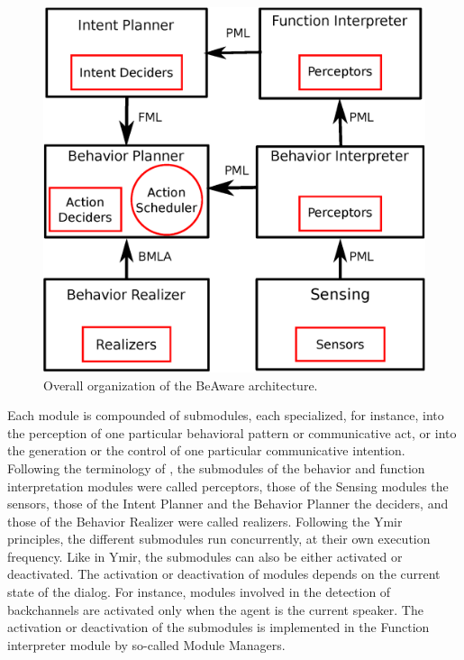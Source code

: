 \begin{figure}
  \centering
  \includegraphics[width=\linewidth]{figure/impl_schema.eps}
  \caption{Overall organization of the BeAware architecture.}
  \label{overall_archi}
\end{figure}

Each module is compounded of submodules, each specialized, for instance, into the perception of one particular behavioral pattern or communicative act, or into the generation or the control of one particular communicative intention. Following the terminology of \cite{thorisson_mind_1999}, the submodules of the behavior and function interpretation modules were called perceptors, those of the Sensing modules the sensors, those of the Intent Planner and the Behavior Planner the deciders, and those of the Behavior Realizer were called realizers. 
Following the Ymir principles, the different submodules run concurrently, at their own execution frequency. 
Like in Ymir, the submodules can also be either activated or deactivated. 
The activation or deactivation of modules depends on the current state of the dialog. 
For instance, modules involved in the detection of backchannels are activated only when the agent is the current speaker. 
The activation or deactivation of the submodules is implemented in the Function interpreter module by so-called Module Managers. 

